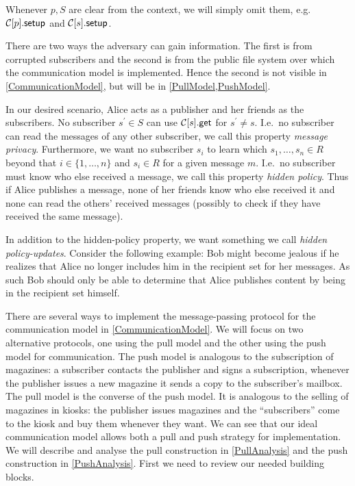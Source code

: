 Whenever \(p, S\) are clear from the context, we will simply omit them, e.g.\ 
\(\csetup{p}\) and \(\csetup{s}\).

There are two ways the adversary can gain information.
The first is from corrupted subscribers and the second is from the public file 
system over which the communication model is implemented.
Hence the second is not visible in \cref{CommunicationModel}, but will be in 
\cref{PullModel,PushModel}.

In our desired scenario, Alice acts as a publisher and her friends as the 
subscribers.
No subscriber \(s^\prime\in S\) can use \(\cget{s}\) for \(s^\prime\neq s\).
I.e.\ no subscriber can read the messages of any other subscriber, we call this 
property \emph{message privacy}.
Furthermore, we want no subscriber \(s_i\) to learn which \(s_1, \ldots, s_n\in 
  R\) beyond that \(i\in \{1, \ldots, n\}\) and \(s_i\in R\) for a given 
message \(m\).
I.e.\ no subscriber must know who else received a message, we call this 
property \emph{hidden policy}.
Thus if Alice publishes a message, none of her friends know who else received 
it and none can read the others' received messages (possibly to check if they 
have received the same message).


In addition to the hidden-policy property, we want something we call 
\emph{hidden policy-updates}.
Consider the following example:
Bob might become jealous if he realizes that Alice no longer includes him in 
the recipient set for her messages.
As such Bob should only be able to determine that Alice publishes content by 
being in the recipient set himself.

There are several ways to implement the message-passing protocol for the 
communication model in \cref{CommunicationModel}.
We will focus on two alternative protocols, one using the pull model and the 
other using the push model for communication.
The push model is analogous to the subscription of magazines:
a subscriber contacts the publisher and signs a subscription, whenever the 
publisher issues a new magazine it sends a copy to the subscriber's mailbox.
The pull model is the converse of the push model.
It is analogous to the selling of magazines in kiosks:
the publisher issues magazines and the \enquote{subscribers} come to the kiosk 
and buy them whenever they want.
We can see that our ideal communication model allows both a pull and push 
strategy for implementation.
We will describe and analyse the pull construction in \cref{PullAnalysis} and 
the push construction in \cref{PushAnalysis}.
First we need to review our needed building blocks.
